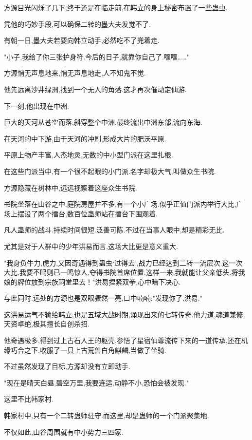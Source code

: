 \begin{this_body}
方源目光闪烁了几下,终于还是在临走前,在韩立的身上秘密布置了一些蛊虫.

凭他的巧妙手段,可以确保二转的墨大夫发觉不了.

有朝一日,墨大夫若要向韩立动手,必然吃不了兜着走.

"小子,我给了你三张护身符.今后的日子,就靠你自己了.嘿嘿……"

方源悄无声息地来,悄无声息地走,人不知鬼不觉.

他先远离沙井绿洲,找到一个无人的角落.这才再次催动定仙游.

下一刻,他出现在中洲.

巨大的天河从苍空而落,斜穿整个中洲.最终流出中洲东部,流向东海.

在天河的中下游,由于天河的冲刷,形成大片的肥沃平原.

平原上物产丰富,人杰地灵,无数的中小型门派在这里扎根.

在这些门派当中,有一个很不起眼的小门派.名字却极大气,叫做众生书院.

方源隐藏在树林中,远远视察着这座众生书院.

书院坐落在山谷之中.庭院房屋并不多,有一个小广场.似乎正值门派内举行大比,广场上摆设了两个擂台,数百位蛊师站在擂台下围观着.

凡人蛊师的战斗.持续时间很短.泛善可陈.不过在当事人眼中,却是精彩无比.

尤其是对于人群中的少年洪易而言,这场大比更是意义重大.

"我身负牛力,虎力,又因奇遇得到蛊虫‘过得去’,战力已经达到二转一流层次.这一次大比,我要不鸣则已一鸣惊人,夺得书院首席位置.这样一来,我就能让父亲低头.将我娘的牌位放到宗族祠堂里去！"洪易捏紧双拳,心中暗下决心.

与此同时.远处的方源也是双眼骤然一亮,口中喃喃:"发现你了,洪易."

这洪易运气不输给韩立,也是五域大战时期,涌现出来的七转传奇.他力道,魂道兼修,天资卓绝,极其擅长自创杀招.

他奇遇极多,得到过上古石人王的躯壳,参悟了星宿仙尊流传下来的一道传承,还在机缘巧合之下,收服了一只上古荒兽白角麒麟,当做了坐骑.

不过虽然发现了目标,方源却没有立即动手.

"现在是晴天白昼,碧空万里,我要连运,动静不小,恐怕会被发现."

这里不比韩家村.

韩家村中,只有一个二转蛊师驻守.而这里,却是蛊师的一个门派聚集地.

不仅如此,山谷周围就有中小势力三四家.


\end{this_body}
